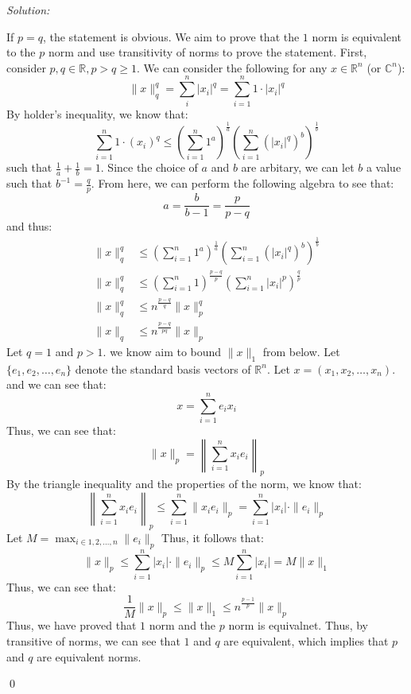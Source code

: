 \documentclass[12pt]{article}
\newenvironment{problem}[2][Problem]{\begin{trivlist}
\item[\hskip \labelsep {\bfseries #1}\hskip \labelsep {\bfseries #2.}]}{\end{trivlist}}
\newenvironment{sol}
    {\emph{Solution:}
    }
    {
    \qed
    }
\newcommand{\R}{\mathbb{R}}
\newcommand{\C}{\mathbb{C}}
\begin{document}
\begin{sol}
    If $p = q$, the statement is obvious. We aim to prove that the $1$ norm is equivalent to the $p$ norm and use transitivity of norms to prove the statement. First, consider $p, q \in \R, p > q \geq 1$. We can consider the following for any $x \in \R^n$ (or $\C^n$):
    \[
    \|x \|_q^q = \sum_{i}^n |x_i|^q = \sum_{i =1}^{n} 1 \cdot |x_i|^q
    \]
    By holder's inequality, we know that:
    \[
    \sum_{i=1}^{n} 1 \cdot (x_i)^q \leq \left( \sum_{i = 1}^{n} 1^a \right)^\frac{1}{a} \left( \sum_{i = 1}^{n} (|x_i|^q)^b \right)^\frac{1}{b}
    \]
    such that $\frac{1}{a} + \frac{1}{b} = 1$. Since the choice of $a$ and $b$ are arbitary, we can let $b$ a value such that $b^{-1} = \frac{q}{p}$. From here, we can perform the following algebra to see that:
    \[
    a = \frac{b }{b-1} = \frac{p}{p-q}
    \]
    and thus:
    \begin{align*}
        \|x\|_q^q & \leq \left( \sum_{i = 1}^{n} 1^a \right)^\frac{1}{a} \left( \sum_{i = 1}^{n} (|x_i|^q)^b \right)^\frac{1}{b}\\
        \|x\|_q^q &\leq \left( \sum_{i = 1}^{n} 1 \right)^\frac{p-q}{p} \left( \sum_{i = 1}^{n} |x_i|^p \right)^\frac{q}{p}\\
        \|x\|_q^q  & \leq n^\frac{p-q}{q} \| x\|_p^q\\
        \|x\|_q & \leq n^\frac{p-q}{pq} \|x\|_p
    \end{align*}
    Let $q = 1$ and $p > 1$. we know aim to bound $\|x\|_1$ from below. Let $\{e_1, e_2, \dots, e_n\}$ denote the standard basis vectors of $\R^n$. Let $x = (x_1, x_2, \dots, x_n)$. and we can see that:
    \[
    x = \sum_{i=1}^{n} e_i x_i
    \]
    Thus, we can see that:
    \[
    \|x\|_p = \left\| \sum_{i=1}^{n} x_i e_i \right \|_p 
    \]
    By the triangle inequality and the properties of the norm, we know that:
    \[
        \left\| \sum_{i=1}^{n} x_i e_i \right \|_p \leq \sum_{i=1}^{n} \|x_i e_i\|_p = \sum_{i=1}^{n} |x_i| \cdot \|e_i\|_p
    \]
    Let $M = \max_{i \in 1,2,\dots, n} \|e_i\|_p$ Thus, it follows that:
    \[
    \|x\|_p \leq \sum_{i=1}^{n}  |x_i| \cdot \|e_i\|_p \leq M \sum_{i=1}^{n} |x_i| = M \|x\|_1
    \]
    Thus, we can see that:
    \[
    \frac{1}{M} \|x\|_p \leq \|x\|_1 \leq n^\frac{p-1}{p} \|x\|_p
    \]
    Thus, we have proved that $1$ norm and the $p$ norm is equivalnet. Thus, by transitive of norms, we can see that $1$ and $q$ are equivalent, which implies that $p$ and $q$ are equivalent norms.
\end{sol}
\newpage
\begin{problem}{4}
    
\end{problem}
\end{document}
